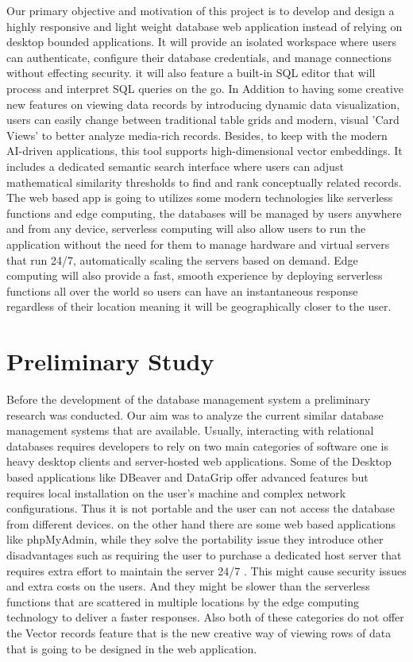 Our primary objective and motivation of this project is to develop and design a highly responsive and light weight database web application instead of relying on desktop bounded applications. It will provide an isolated workspace where users can authenticate, configure their database credentials, and manage connections without effecting security. it will also feature a built-in SQL editor that will process and interpret SQL queries on the go. In Addition to having some creative new features on viewing data records by introducing dynamic data visualization, users can easily change between traditional table grids and modern, visual 'Card Views' to better analyze media-rich records. Besides, to keep with the modern AI-driven applications, this tool supports high-dimensional vector embeddings. It includes a dedicated semantic search interface where users can adjust mathematical similarity thresholds to find and rank conceptually related records. The web based app is going to utilizes some modern technologies like serverless functions and edge computing, the databases will be managed by users anywhere and from any device, serverless computing will also allow users to run the application without the need for them to manage hardware and virtual servers that run 24/7, automatically scaling the servers based on demand. Edge computing will also provide a fast, smooth experience by deploying serverless functions all over the world so users can have an instantaneous response regardless of their location meaning it will be geographically closer to the user.

\section{Preliminary Study}


Before the development of the database management system a preliminary research was conducted. Our aim was to analyze the current similar database management systems that are available. Usually, interacting with relational databases requires developers to rely on two main categories of software one is heavy desktop clients and server-hosted web applications. Some of the Desktop based applications like DBeaver and DataGrip offer advanced features but requires local installation on the user's machine and complex network configurations. Thus it is not portable and the user can not access the database from different devices. on the other hand there are some web based applications like phpMyAdmin, while they solve the portability issue they introduce other disadvantages such as requiring the user to purchase a dedicated host server that requires extra effort to maintain the server 24/7 . This might cause security issues and extra costs on the users. And they might be slower than the serverless functions that are scattered in multiple locations by the edge computing technology to deliver a faster responses. Also both of these categories do not offer the Vector records feature that is the new creative way of viewing rows of data that is going to be designed in the web application.

